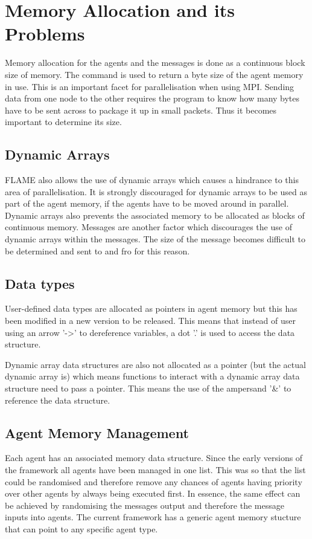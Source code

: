 \section{Memory Allocation and its Problems}

Memory allocation for the agents and the messages is done as a continuous block size of memory.
The command  is used to return a byte size of the agent memory in use.
This is an important facet for parallelisation when using MPI. Sending data from one node to the other requires the program to know how many bytes have to be sent across to package it up in small packets. Thus it becomes important to determine its size.

\subsection{Dynamic Arrays}
FLAME also allows the use of dynamic arrays which causes a hindrance to this area of parallelisation. It is strongly discouraged for dynamic arrays to be used as part of the agent memory, if the agents have to be moved around in parallel. Dynamic arrays also prevents the associated memory to be allocated as blocks of continuous memory. Messages are another factor which discourages the use of dynamic arrays within the messages. The size of the message becomes difficult to be determined and sent to and fro for this reason.

\subsection{Data types}

User-defined data types are allocated as pointers in agent memory but
this has been modified in a new version to be released. This means that instead
of user using an arrow '-\textgreater' to dereference variables, a dot '.' is
used to access the data structure.

Dynamic array data structures are also not allocated as a pointer (but the actual
dynamic array is) which means functions to interact with a dynamic array data
structure need to pass a pointer. This means the use of the ampersand '\&' to
reference the data structure.

\subsection{Agent Memory Management}

Each agent has an associated memory data structure. Since the early versions of the
framework all agents have been managed in one list. This was so that the list
could be randomised and therefore remove any chances of agents having priority
over other agents by always being executed first. In essence, the same effect can be achieved by randomising the messages output and therefore the message inputs into agents.
The current framework has a generic agent memory stucture that can point to any
specific agent type.

